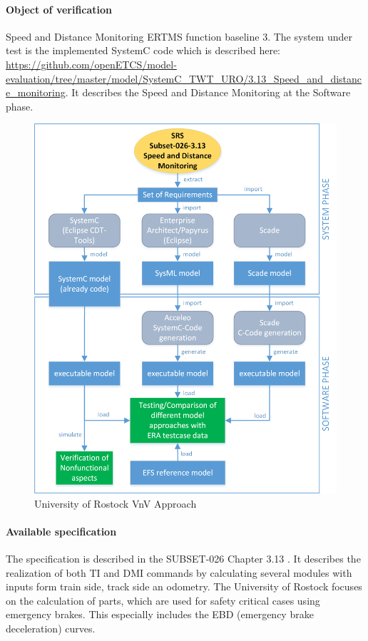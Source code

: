 \paragraph{Object of verification}  Speed and Distance Monitoring ERTMS function baseline 3.
The system under test is the implemented SystemC code which is described here: \url{https://github.com/openETCS/model-evaluation/tree/master/model/SystemC_TWT_URO/3.13_Speed_and_distance_monitoring}. It describes the Speed and Distance Monitoring at the Software phase.
\nl

\begin{figure}[h]
\centering
\includegraphics[width=.80\textwidth]{schema/UniRostockApproach.png}
\vspace{4mm}
\caption{University of Rostock VnV Approach}
\label{fig:University of Rostock VnV Approach} 
\end{figure}

\paragraph{Available specification}

The specification is described in the
SUBSET-026 Chapter 3.13 \cite{unisig_subset-026_2012}. It describes the realization of both TI and DMI commands by calculating several modules with inputs form train side, track side an odometry. The University of Rostock focuses on the calculation of parts, which are used for safety critical cases using emergency brakes. This especially includes the EBD (emergency brake deceleration) curves.

